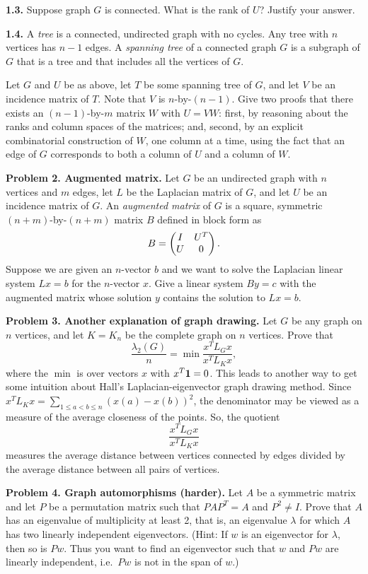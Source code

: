 \documentclass[11pt]{article}
\newcommand{\m}[1]{{\bf{#1}}}       %
\newcommand{\ones}{\m1}             %
\begin{document}
\par\bigskip
{\bf 1.3.} 
Suppose graph $G$ is connected.  What is the rank of $U$?  Justify your answer.

\par\bigskip
{\bf 1.4.} 
A {\em tree} is a connected, undirected graph with no cycles.
Any tree with $n$ vertices has $n-1$ edges.
A {\em spanning tree} of a connected graph $G$ is a 
subgraph of $G$ that is a tree and that includes all 
the vertices of $G$. 
\par
Let $G$ and $U$ be as above, let $T$ be some spanning
tree of $G$, and let $V$ be an incidence matrix of $T$.
Note that $V$ is $n$-by-$(n-1)$.
Give two proofs that there exists an $(n-1)$-by-$m$ 
matrix $W$ with $U=VW$:
first, by reasoning about the ranks and column
spaces of the matrices;
and, second, by an explicit combinatorial construction
of $W$, one column at a time,
using the fact that an edge of $G$ corresponds to
both a column of $U$ and a column of $W$.

\par\bigskip
{\bf Problem 2. Augmented matrix.}
Let $G$ be an undirected graph with $n$ vertices and $m$ edges,
let $L$ be the Laplacian matrix of $G$, 
and let $U$ be an incidence matrix of $G$.
An {\em augmented matrix} of $G$ is a square, 
symmetric $(n+m)$-by-$(n+m)$ matrix $B$ defined in block form as
$$
B =
\begin{pmatrix}
I & U^T \cr
U & 0 \cr
\end{pmatrix}
.
$$
Suppose we are given an $n$-vector $b$ and we want to 
solve the Laplacian linear system $Lx=b$ for the $n$-vector $x$.
Give a linear system $By = c$ with the augmented matrix
whose solution $y$ contains the solution to $Lx=b$.

\par\bigskip
{\bf Problem 3. Another explanation of graph drawing.} 
Let $G$ be any graph on $n$ vertices, 
and let $K = K_n$ be the complete graph on $n$ vertices.
Prove that
$$
\frac{\lambda_2(G)}{n} = \min\frac{x^TL_Gx}{x^TL_Kx},
$$
where the $\min$ is over vectors $x$ with
$x^T\ones=0$.
This leads to another way to get some intuition about 
Hall's Laplacian-eigenvector graph drawing method.
Since $x^TL_Kx = \sum_{1\le a<b\le n}(x(a)-x(b))^2$,
the denominator may be viewed as a measure of the average
closeness of the points. So, the quotient
$$
\frac{x^TL_Gx}{x^TL_Kx}
$$
measures the average distance between vertices connected by edges
divided by the average distance between all pairs of vertices.

\par\bigskip
{\bf Problem 4. Graph automorphisms (harder).} 
Let $A$ be a symmetric matrix and let $P$ be a permutation matrix
such that $PAP^T=A$ and $P^2\ne I$.
Prove that $A$ has an eigenvalue of multiplicity at least 2,
that is, an eigenvalue $\lambda$ for which $A$ has two
linearly independent eigenvectors.
(Hint: If $w$ is an eigenvector for $\lambda$, then so is $Pw$.
Thus you want to find an eigenvector such that $w$ and $Pw$ are
linearly independent, i.e.\ $Pw$ is not in the span of $w$.)
\end{document}
